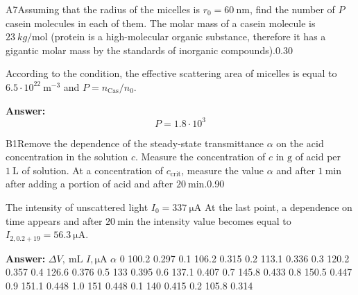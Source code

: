 \documentclass[11pt,a4paper]{article}
\begin{document}
\begin{solcard}{A7}{Assuming that the radius of the micelles is $r_0=60~\text{nm}$, find the number of $P$ casein molecules in each of them. The molar mass of a casein molecule is $23~kg/\mathrm{mol}$ (protein is a high-molecular organic substance, therefore it has a gigantic molar mass by the standards of inorganic compounds).}{0.30}

According to the condition, the effective scattering area of micelles is equal to $6.5 \cdot 10^{22}~\text{m}^{-3}$ and $P=n_\mathrm{Cas}/n_0$.

\par\smallskip\noindent\textbf{Answer:} $$P = 1.8 \cdot 10^3$$
\end{solcard}

\begin{solcard}{B1}{Remove the dependence of the steady-state transmittance $\alpha$ on the acid concentration in the solution $c$. Measure the concentration of $c$ in $\text{g}$ of acid per $1~\mathrm{L}$ of solution. At a concentration of $c_\text{crit}$, measure the value $\alpha$ and after $1~\text{min}$ after adding a portion of acid and after $20~\text{min}$.}{0.90}

The intensity of unscattered light $I_0=337~\mathrm{\mu A}$ At the last point, a dependence on time appears and after $20~\text{min}$ the intensity value becomes equal to $I_{2,0.2+19}=56.3~\mathrm{\mu A}$.

\par\smallskip\noindent\textbf{Answer:} $\Delta V,~\mathrm{mL}$ $I, \mathrm{\mu A}$ $\alpha$ 0 100.2 0.297 0.1 106.2 0.315 0.2 113.1 0.336 0.3 120.2 0.357 0.4 126.6 0.376 0.5 133 0.395 0.6 137.1 0.407 0.7 145.8 0.433 0.8 150.5 0.447 0.9 151.1 0.448 1.0 151 0.448 0.1 140 0.415 0.2 105.8 0.314
\end{solcard}
\end{document}
